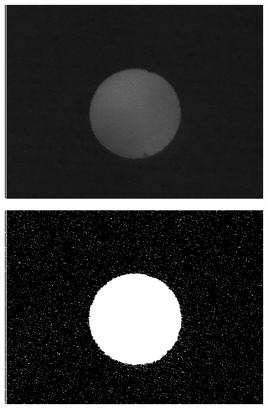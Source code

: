 \documentclass[12pt,a4paper]{article}
\begin{document}
\begin{figure}[!htbp]
    \centering
    \begin{minipage}{0.48\linewidth}
        \centering
        \includegraphics[width=\linewidth]{threshold-origin.png}
        \label{fig:thres-origin}
    \end{minipage} \hfill
    \begin{minipage}{0.48\linewidth}
        \centering
        \includegraphics[width=\linewidth]{graymean.png}
        \label{fig:graymean}
    \end{minipage} \\
    \begin{minipage}{0.48\linewidth}

\end{minipage}
\end{figure}
\end{document}
